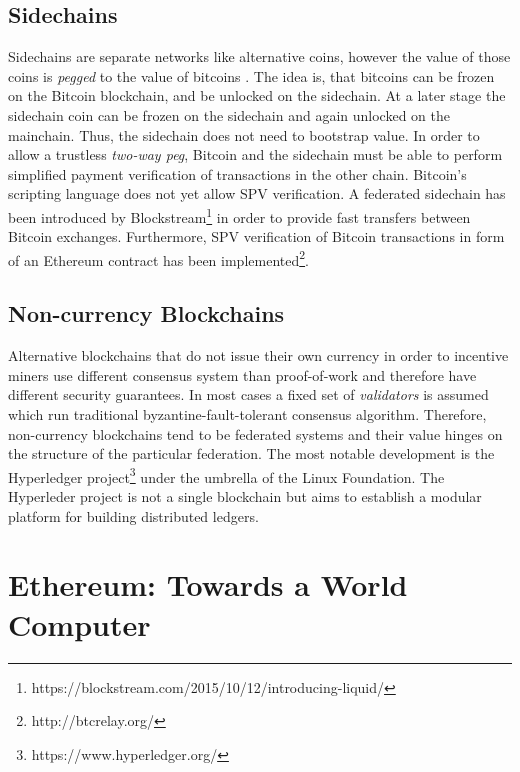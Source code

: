 \subsection{Sidechains}
Sidechains are separate networks like alternative coins, however the value of those coins is \emph{pegged} to the value of bitcoins \parencite{backenabling}. The idea is, that bitcoins can be frozen on the Bitcoin blockchain, and be unlocked on the sidechain. At a later stage the sidechain coin can be frozen on the sidechain and again unlocked on the mainchain. Thus, the sidechain does not need to bootstrap value.
In order to allow a trustless \emph{two-way peg}, Bitcoin and the sidechain must be able to perform simplified payment verification of transactions in the other chain. Bitcoin's scripting language does not yet allow SPV verification. A federated sidechain has been introduced by Blockstream\footnote{https://blockstream.com/2015/10/12/introducing-liquid/} in order to provide fast transfers between Bitcoin exchanges. Furthermore, SPV verification of Bitcoin transactions in form of an Ethereum contract has been implemented\footnote{http://btcrelay.org/}.

\subsection{Non-currency Blockchains}

Alternative blockchains that do not issue their own currency in order to incentive miners use different consensus system than proof-of-work and therefore have different security guarantees. In most cases a fixed set of \emph{validators} is assumed which run traditional byzantine-fault-tolerant consensus algorithm. Therefore, non-currency blockchains tend to be federated systems and their value hinges on the structure of the particular federation. The most notable development is the Hyperledger project\footnote{https://www.hyperledger.org/} under the umbrella of the Linux Foundation. The Hyperleder project is not a single blockchain but aims to establish a modular platform for building distributed ledgers.



\section{Ethereum: Towards a World Computer}
\label{sec:ethereum}

